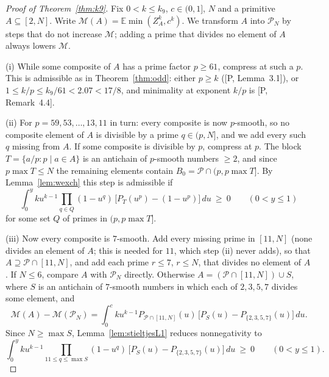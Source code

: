 \documentclass[11pt]{article}
\theoremstyle{remark}
\newcommand{\Prm}{\mathcal{P}}
\newcommand{\E}{\mathbb{E}}
\begin{document}
\begin{proof}[Proof of Theorem~\ref{thm:k9}]
Fix $0<k\le k_9$, $c\in(0,1]$, $N$ and a primitive $A\subseteq[2,N]$. Write
$\mathcal M(A)=\E\min(Z_A^k,c^k)$. We transform $A$ into $\Prm_N$ by steps that do not increase
$\mathcal M$; adding a prime that divides no element of $A$ always lowers $\mathcal M$.

(i) While some composite of $A$ has a prime factor $p\ge61$, compress at such a $p$. This is
admissible as in Theorem~\ref{thm:odd}: either $p\ge k$ ([P, Lemma~3.1]), or
$1\le k/p\le k_9/61<2.07<17/8$, and minimality at exponent $k/p$ is [P, Remark~4.4].

(ii) For $p=59,53,\dots,13,11$ in turn: every composite is now $p$-smooth, so no composite
element of $A$ is divisible by a prime $q\in(p,N]$, and we add every such $q$ missing from $A$. If some
composite is divisible by $p$, compress at $p$. The block $T=\{a/p:p\mid a\in A\}$ is an antichain
of $p$-smooth numbers $\ge2$, and since $p\max T\le N$ the remaining elements contain
$B_0=\Prm\cap(p,p\max T]$. By Lemma~\ref{lem:wexch} this step is admissible if
\begin{equation}\label{eq:Cp}
\int_0^yku^{k-1}\prod_{q\in Q}(1-u^q)\,\bigl[P_T(u^p)-(1-u^p)\bigr]\,du\ \ge\ 0\qquad(0<y\le1)
\end{equation}
for some set $Q$ of primes in $(p,p\max T]$.

(iii) Now every composite is $7$-smooth. Add every missing prime in $[11,N]$ (none divides an
element of $A$; this is needed for $11$, which step (ii) never adds), so that
$A\supseteq\Prm\cap[11,N]$, and add each prime $r\le7$, $r\le N$, that divides no element of $A$. If $N\le6$, compare $A$ with $\Prm_N$ directly.
Otherwise $A=(\Prm\cap[11,N])\cup S$, where $S$ is an antichain of $7$-smooth numbers in which
each of $2,3,5,7$ divides some element, and
\[
\mathcal M(A)-\mathcal M(\Prm_N)=\int_0^cku^{k-1}P_{\Prm\cap[11,N]}(u)\,
\bigl[P_S(u)-P_{\{2,3,5,7\}}(u)\bigr]\,du .
\]
Since $N\ge\max S$, Lemma~\ref{lem:stieltjesL1} reduces nonnegativity to
\begin{equation}\label{eq:Cstar}
\int_0^yku^{k-1}\prod_{11\le q\le\max S}(1-u^q)\,\bigl[P_S(u)-P_{\{2,3,5,7\}}(u)\bigr]\,du\ \ge\ 0
\qquad(0<y\le1).
\end{equation}


\end{proof}
\end{document}
